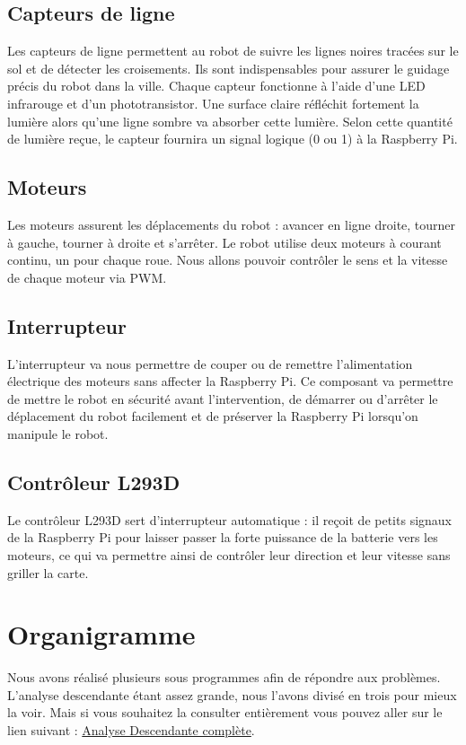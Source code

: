 \subsection{Capteurs de ligne }
Les capteurs de ligne permettent au robot de suivre les lignes noires tracées sur le sol et de détecter les croisements. Ils sont indispensables pour assurer le guidage précis du robot dans la ville.
Chaque capteur fonctionne à l'aide d'une LED infrarouge et d'un phototransistor. Une surface claire réfléchit fortement la lumière alors qu'une ligne sombre va absorber cette lumière. Selon cette quantité de lumière reçue, le capteur fournira un signal logique (0 ou 1) à la Raspberry Pi. 

\subsection{Moteurs}
Les moteurs assurent les déplacements du robot : avancer en ligne droite, tourner à gauche, tourner à droite et s'arrêter.
Le robot utilise deux moteurs à courant continu, un pour chaque roue. Nous allons pouvoir contrôler le sens et la vitesse de chaque moteur via PWM.

\subsection{Interrupteur}
L'interrupteur va nous permettre de couper ou de remettre l'alimentation électrique des moteurs sans affecter la Raspberry Pi. Ce composant va permettre de mettre le robot en sécurité avant l'intervention, de démarrer ou d'arrêter le déplacement du robot facilement et de préserver la Raspberry Pi lorsqu'on manipule le robot.

\subsection{Contrôleur L293D}
Le contrôleur L293D sert d'interrupteur automatique : il reçoit de petits signaux de la Raspberry Pi pour laisser passer la forte puissance de la batterie vers les moteurs, ce qui va permettre ainsi de contrôler leur direction et leur vitesse sans griller la carte.

\section{Organigramme}

Nous avons réalisé plusieurs sous programmes afin de répondre aux problèmes. 
L'analyse descendante étant assez grande, nous l'avons divisé en trois pour mieux la voir. Mais si vous souhaitez la consulter entièrement vous pouvez aller sur le lien suivant :
\href{https://www.canva.com/design/DAG614fXwmo/bapIBcVTE0LtQyUYekXYlA/edit?utm_content=DAG614fXwmo&utm_campaign=designshare&utm_medium=link2&utm_source=sharebutton}{Analyse Descendante complète}.

